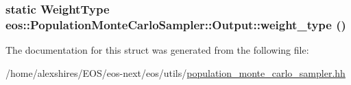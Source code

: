 \label{structeos_1_1PopulationMonteCarloSampler_1_1Output_a6bcb392149e9b1f026f96d123f88d9d8}
\hypertarget{structeos_1_1PopulationMonteCarloSampler_1_1Output_ad7a4912cebc0c3d00052a398aaef15dd}{
\subsubsection[{weight\_\-type}]{\setlength{\rightskip}{0pt plus 5cm}static {\bf WeightType} eos::PopulationMonteCarloSampler::Output::weight\_\-type ()}}
\label{structeos_1_1PopulationMonteCarloSampler_1_1Output_ad7a4912cebc0c3d00052a398aaef15dd}


The documentation for this struct was generated from the following file:\begin{DoxyCompactItemize}
\item 
/home/alexshires/EOS/eos-\/next/eos/utils/\hyperlink{population__monte__carlo__sampler_8hh}{population\_\-monte\_\-carlo\_\-sampler.hh}\end{DoxyCompactItemize}
